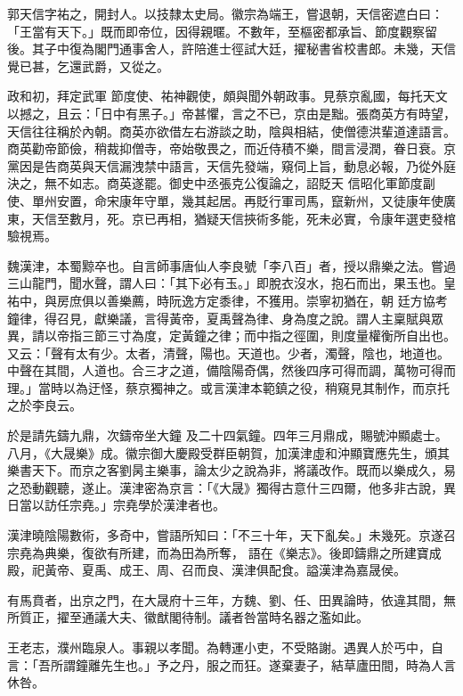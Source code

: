\begin{pinyinscope}
 郭天信字祐之，開封人。以技隸太史局。徽宗為端王，嘗退朝，天信密遮白曰：「王當有天下。」既而即帝位，因得親暱。不數年，至樞密都承旨、節度觀察留後。其子中復為閣門通事舍人，許陪進士徑試大廷，擢秘書省校書郎。未幾，天信覺已甚，乞還武爵，又從之。



 政和初，拜定武軍
 節度使、祐神觀使，頗與聞外朝政事。見蔡京亂國，每托天文以撼之，且云：「日中有黑子。」帝甚懼，言之不已，京由是黜。張商英方有時望，天信往往稱於內朝。商英亦欲借左右游談之助，陰與相結，使僧德洪輩道達語言。商英勸帝節儉，稍裁抑僧寺，帝始敬畏之，而近侍積不樂，間言浸潤，眷日衰。京黨因是告商英與天信漏洩禁中語言，天信先發端，窺伺上旨，動息必報，乃從外庭決之，無不如志。商英遂罷。御史中丞張克公復論之，詔貶天
 信昭化軍節度副使、單州安置，命宋康年守單，幾其起居。再貶行軍司馬，竄新州，又徒康年使廣東，天信至數月，死。京已再相，猶疑天信挾術多能，死未必實，令康年選吏發棺驗視焉。



 魏漢津，本蜀黥卒也。自言師事唐仙人李良號「李八百」者，授以鼎樂之法。嘗過三山龍門，聞水聲，謂人曰：「其下必有玉。」即脫衣沒水，抱石而出，果玉也。皇祐中，與房庶俱以善樂薦，時阮逸方定黍律，不獲用。崇寧初猶在，朝
 廷方協考鐘律，得召見，獻樂議，言得黃帝，夏禹聲為律、身為度之說。謂人主稟賦與眾異，請以帝指三節三寸為度，定黃鐘之律；而中指之徑圍，則度量權衡所自出也。又云：「聲有太有少。太者，清聲，陽也。天道也。少者，濁聲，陰也，地道也。中聲在其間，人道也。合三才之道，備陰陽奇偶，然後四序可得而調，萬物可得而理。」當時以為迂怪，蔡京獨神之。或言漢津本範鎮之役，稍窺見其制作，而京托之於李良云。



 於是請先鑄九鼎，次鑄帝坐大鐘
 及二十四氣鐘。四年三月鼎成，賜號沖顯處士。八月，《大晟樂》成。徽宗御大慶殿受群臣朝賀，加漢津虛和沖顯寶應先生，頒其樂書天下。而京之客劉昺主樂事，論太少之說為非，將議改作。既而以樂成久，易之恐動觀聽，遂止。漢津密為京言：「《大晟》獨得古意什三四爾，他多非古說，異日當以訪任宗堯。」宗堯學於漢津者也。



 漢津曉陰陽數術，多奇中，嘗語所知曰：「不三十年，天下亂矣。」未幾死。京遂召宗堯為典樂，復欲有所建，而為田為所奪，
 語在《樂志》。後即鑄鼎之所建寶成殿，祀黃帝、夏禹、成王、周、召而良、漢津俱配食。謚漢津為嘉晟侯。



 有馬賁者，出京之門，在大晟府十三年，方魏、劉、任、田異論時，依違其間，無所質正，擢至通議大夫、徽猷閣待制。議者咎當時名器之濫如此。



 王老志，濮州臨泉人。事親以孝聞。為轉運小吏，不受賂謝。遇異人於丐中，自言：「吾所謂鐘離先生也。」予之丹，服之而狂。遂棄妻子，結草廬田間，時為人言休咎。




\end{pinyinscope}
